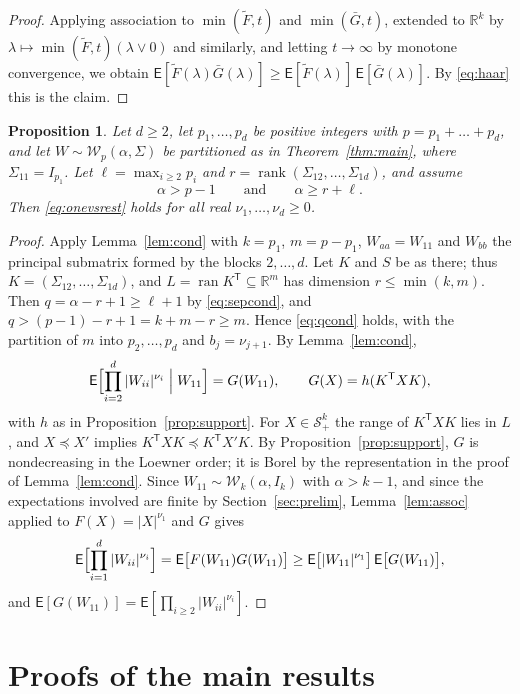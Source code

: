 \documentclass{amsart}
\newtheorem{proposition}[theorem]{Proposition}
\theoremstyle{definition}
\theoremstyle{remark}
\numberwithin{equation}{section}
\newcommand{\R}{\mathbb{R}}
\newcommand{\E}{\mathsf{E}}
\newcommand{\Sym}{\mathcal{S}}
\newcommand{\W}{\mathcal{W}}
\newcommand{\ran}{\operatorname{ran}}
\newcommand{\rank}{\operatorname{rank}}
\begin{document}
\begin{proof}
Applying association to $\min(\tilde F,t)$ and $\min(\bar G,t)$, extended to $\R^k$ by $\lambda\mapsto\min(\tilde F,t)(\lambda\vee0)$ and similarly, and letting $t\to\infty$ by monotone convergence, we obtain $\E[\tilde F(\lambda)\bar G(\lambda)]\ge\E[\tilde F(\lambda)]\,\E[\bar G(\lambda)]$. By \eqref{eq:haar} this is the claim.
\end{proof}

\begin{proposition}\label{prop:sep}
Let $d\ge2$, let $p_1,\dots,p_d$ be positive integers with $p=p_1+\dots+p_d$, and let $W\sim\W_p(\alpha,\Sigma)$ be partitioned as in Theorem~\ref{thm:main}, where $\Sigma_{11}=I_{p_1}$. Let $\ell=\max_{i\ge2}p_i$ and $r=\rank(\Sigma_{12},\dots,\Sigma_{1d})$, and assume
\begin{equation}\label{eq:sepcond}
\alpha>p-1\qquad\text{and}\qquad\alpha\ge r+\ell .
\end{equation}
Then \eqref{eq:onevsrest} holds for all real $\nu_1,\dots,\nu_d\ge0$.
\end{proposition}

\begin{proof}
Apply Lemma~\ref{lem:cond} with $k=p_1$, $m=p-p_1$, $W_{aa}=W_{11}$ and $W_{bb}$ the principal submatrix formed by the blocks $2,\dots,d$. Let $K$ and $S$ be as there; thus $K=(\Sigma_{12},\dots,\Sigma_{1d})$, and $L=\ran K^{\mathsf T}\subseteq\R^m$ has dimension $r\le\min(k,m)$. Then $q=\alpha-r+1\ge\ell+1$ by \eqref{eq:sepcond}, and $q>(p-1)-r+1=k+m-r\ge m$. Hence \eqref{eq:qcond} holds, with the partition of $m$ into $p_2,\dots,p_d$ and $b_j=\nu_{j+1}$. By Lemma~\ref{lem:cond},
\[
\E\Bigl[\prod_{i=2}^d|W_{ii}|^{\nu_i}\Bigm|W_{11}\Bigr]=G(W_{11}),\qquad G(X)=h(K^{\mathsf T}XK),
\]
with $h$ as in Proposition~\ref{prop:support}. For $X\in\Sym^k_+$ the range of $K^{\mathsf T}XK$ lies in $L$, and $X\preceq X'$ implies $K^{\mathsf T}XK\preceq K^{\mathsf T}X'K$. By Proposition~\ref{prop:support}, $G$ is nondecreasing in the Loewner order; it is Borel by the representation in the proof of Lemma~\ref{lem:cond}. Since $W_{11}\sim\W_k(\alpha,I_k)$ with $\alpha>k-1$, and since the expectations involved are finite by Section~\ref{sec:prelim}, Lemma~\ref{lem:assoc} applied to $F(X)=|X|^{\nu_1}$ and $G$ gives
\[
\E\Bigl[\prod_{i=1}^d|W_{ii}|^{\nu_i}\Bigr]=\E\bigl[F(W_{11})G(W_{11})\bigr]\ge\E\bigl[|W_{11}|^{\nu_1}\bigr]\,\E\bigl[G(W_{11})\bigr],
\]
and $\E[G(W_{11})]=\E[\prod_{i\ge2}|W_{ii}|^{\nu_i}]$.
\end{proof}

\section{Proofs of the main results}\label{sec:proofs}
\end{document}
